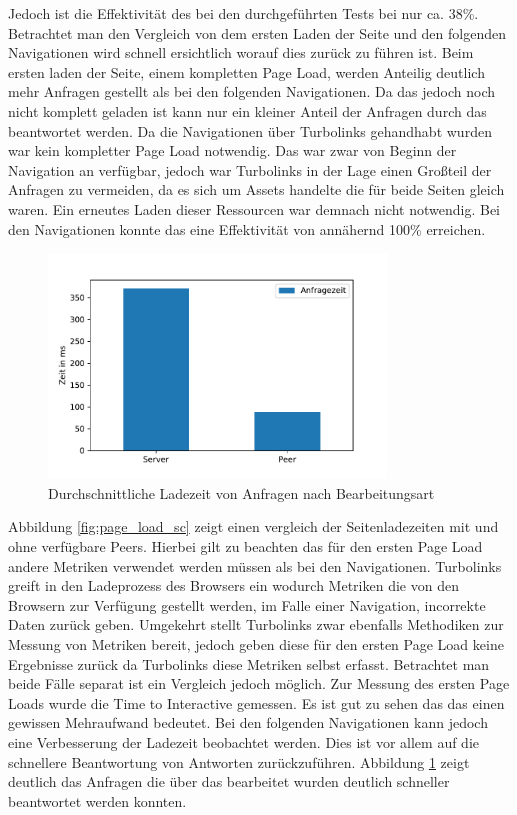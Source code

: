 Jedoch ist die Effektivität des \cdns bei den durchgeführten Tests bei nur ca. 38\%. Betrachtet man den Vergleich von dem ersten Laden der Seite und den folgenden Navigationen wird schnell ersichtlich worauf dies zurück zu führen ist. Beim ersten laden der Seite, einem kompletten Page Load, werden Anteilig deutlich mehr Anfragen gestellt als bei den folgenden Navigationen. Da das \cdn jedoch noch nicht komplett geladen ist kann nur ein kleiner Anteil der Anfragen durch das \cdn beantwortet werden. Da die Navigationen über Turbolinks gehandhabt wurden war kein kompletter Page Load notwendig. Das \cdn war zwar von Beginn der Navigation an verfügbar, jedoch war Turbolinks in der Lage einen Großteil der Anfragen zu vermeiden, da es sich um Assets handelte die für beide Seiten gleich waren. Ein erneutes Laden dieser Ressourcen war demnach nicht notwendig. Bei den Navigationen konnte das \cdn eine Effektivität von annähernd 100\% erreichen. 

\begin{figure}[!h]
	\centering
	\includegraphics[width=0.8\textwidth]{figures/request_load}
	\caption[A Figure Short-Title]{Durchschnittliche Ladezeit von Anfragen nach Bearbeitungsart}
	\label{fig:request_load}
\end{figure}

Abbildung \ref{fig:page_load_sc} zeigt einen vergleich der Seitenladezeiten mit und ohne verfügbare Peers. Hierbei gilt zu beachten das für den ersten Page Load andere Metriken verwendet werden müssen als bei den Navigationen. Turbolinks greift in den Ladeprozess des Browsers ein wodurch Metriken die von den Browsern zur Verfügung gestellt werden, im Falle einer Navigation, incorrekte Daten zurück geben. Umgekehrt stellt Turbolinks zwar ebenfalls Methodiken zur Messung von Metriken bereit, jedoch geben diese für den ersten Page Load keine Ergebnisse zurück da Turbolinks diese Metriken selbst erfasst. Betrachtet man beide Fälle separat ist ein Vergleich jedoch möglich. Zur Messung des ersten Page Loads wurde die Time to Interactive gemessen. Es ist gut zu sehen das das \pTp \cdn einen gewissen Mehraufwand bedeutet. Bei den folgenden Navigationen kann jedoch eine Verbesserung der Ladezeit beobachtet werden. Dies ist vor allem auf die schnellere Beantwortung von Antworten zurückzuführen. Abbildung \ref{fig:request_load} zeigt deutlich das Anfragen die über das \pTp \cdn bearbeitet wurden deutlich schneller beantwortet werden konnten.
 

